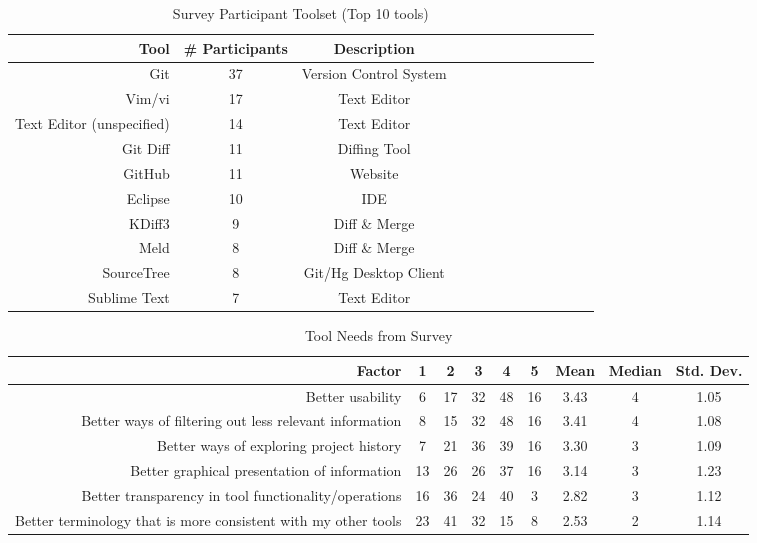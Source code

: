 \begin{table}[!]
\renewcommand{\arraystretch}{1.3}
\caption{Survey Participant Toolset (Top 10 tools)}
\label{survey_toolset}
\centering
\begin{tabularx}{0.45\textwidth}{@{}r|*{10}{C}c@{}c@{}}
\toprule
Tool & \# Participants & Description\\
\midrule
Git	& 37 & Version Control System\\
Vim/vi & 17 & Text Editor\\
Text Editor (unspecified) & 14 & Text Editor\\
Git Diff & 11 & Diffing Tool\\
GitHub & 11 & Website\\
Eclipse & 10 & IDE\\
KDiff3 & 9 & Diff \& Merge\\
Meld & 8 & Diff \& Merge\\
SourceTree & 8 & Git/Hg Desktop Client\\
Sublime Text & 7 & Text Editor\\
\bottomrule
\end{tabularx}
\end{table}

\begin{table*}[!]
\renewcommand{\arraystretch}{1.3}
\caption{Tool Needs from Survey}
\label{survey_tool_needs}
\centering
\begin{tabularx}{0.9\textwidth}{r | *5{c} | *3{c}}

\toprule
	Factor & 1 & 2 & 3 & 4 & 5 & Mean & Median & Std. Dev. \\
\midrule
	Better usability & 6 & 17 & 32 & 48 & 16 & 3.43 & 4 & 1.05\\
	Better ways of filtering out less relevant information & 8 & 15 & 32 & 48 & 16 & 3.41 & 4 & 1.08\\
	Better ways of exploring project history & 7 & 21 & 36 & 39 & 16 & 3.30 & 3 & 1.09\\
	Better graphical presentation of information & 13 & 26 & 26 & 37 & 16 & 3.14 & 3 & 1.23\\
	Better transparency in tool functionality/operations & 16 & 36 & 24 & 40 & 3 & 2.82 & 3 & 1.12\\
	Better terminology that is more consistent with my other tools & 23 & 41 & 32 & 15 & 8 & 2.53 & 2 & 1.14\\
	\bottomrule
\end{tabularx}
\end{table*}